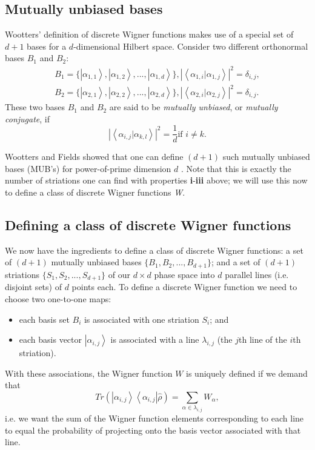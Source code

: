 \documentclass[aps,twocolumn,showpacs,nofootinbib,groupedaddress]{revtex4}
\begin{document}
\subsection{Mutually unbiased bases}

Wootters' definition of discrete Wigner functions makes use of a
special set of $d+1$ bases for a $d$-dimensional Hilbert space.
Consider two different orthonormal bases $B_1$ and $B_2$:
\begin{eqnarray}
B_1=\{
\left|\alpha_{1,1}\right\rangle,\left|\alpha_{1,2}\right\rangle,...,\left|\alpha_{1,d}\right\rangle
\}, \left|\left\langle
\alpha_{1,i}|\alpha_{1,j}\right\rangle\right|^2 =\delta_{i,j}
,\\
B_2=\{
\left|\alpha_{2,1}\right\rangle,\left|\alpha_{2,2}\right\rangle,...,\left|\alpha_{2,d}\right\rangle
\}, \left|\left\langle
\alpha_{2,i}|\alpha_{2,j}\right\rangle\right|^2
=\delta_{i,j}.\end{eqnarray} These two bases $B_1$ and $B_2$ are
said to be \textit{mutually unbiased}, or \textit{mutually
conjugate}, if
\begin{equation}
\left|\left\langle
\alpha_{i,j}|\alpha_{k,l}\right\rangle\right|^2=\frac{1}{d} \text{
if } i\neq k.
\end{equation}

Wootters and Fields showed that one can define $(d+1)$ such
mutually unbiased bases (MUB's) for power-of-prime dimension $d$
\cite{WoottersF89}. Note that this is exactly the number of
striations one can find with properties \textbf{i}-\textbf{iii}
above; we will use this now to define a class of discrete Wigner
functions \textit{W}.

\subsection{Defining a class of discrete Wigner functions}

We now have the ingredients to define a class of discrete Wigner
functions: a set of $(d+1)$ mutually unbiased bases $\{B_1,
B_2,...,B_{d+1}\}$; and a set of $(d+1)$ striations
$\{S_1,S_2,...,S_{d+1}  \}$ of our $d \times d$ phase space into
$d$ parallel lines (i.e. disjoint sets) of $d$ points each. To
define a discrete Wigner function we need to choose two one-to-one
maps:

\begin{itemize}
\item each basis set $B_i$ is associated with one striation $S_i$; and
\item each basis vector $\left|\alpha_{i,j}\right\rangle$ is associated with a line $\lambda_{i,j}$ (the $j$th line of the $i$th striation).
\end{itemize}
With these associations, the Wigner function $W$ is uniquely
defined if we demand that
\begin{equation}
Tr\left(
\left|\alpha_{i,j}\right\rangle\left\langle\alpha_{i,j}\right|
\hat{\rho} \right)=\sum_{\alpha\in
\lambda_{i,j}}W_\alpha,\label{defW}
\end{equation}
i.e. we want the sum of the Wigner function elements corresponding
to each line to equal the probability of projecting onto the basis
vector associated with that line.
\end{document}
